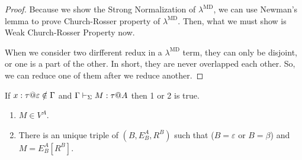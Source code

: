 \begin{proof}	
Because we show the Strong Normalization of $\lambda^{\text{MD}}$, we can use Newman's lemma to prove Church-Rosser property of $\lambda^{\text{MD}}$.
Then, what we must show is Weak Church-Rosser Property now.
	
When we consider two dirfferent redux in a $\lambda^{\text{MD}}$ term, they can only be disjoint, or one is a part of the other.
In short, they are never overlapped each other.
So, we can reduce one of them after we reduce another.
\end{proof}

\begin{lemma}
	If $x:\tau@\varepsilon \notin \G$ and $\Gamma \vdash_\Sigma M : \tau @ A$ then 1 or 2 is true.
	\begin{enumerate}
		\item $ M \in V^A$.
		\item There is an unique triple of $(B, E^A_B, R^B)$ such that ($B = \varepsilon$ or $B = \beta$) and $M = E^A_B[R^B]$.
	\end{enumerate}
\end{lemma}

